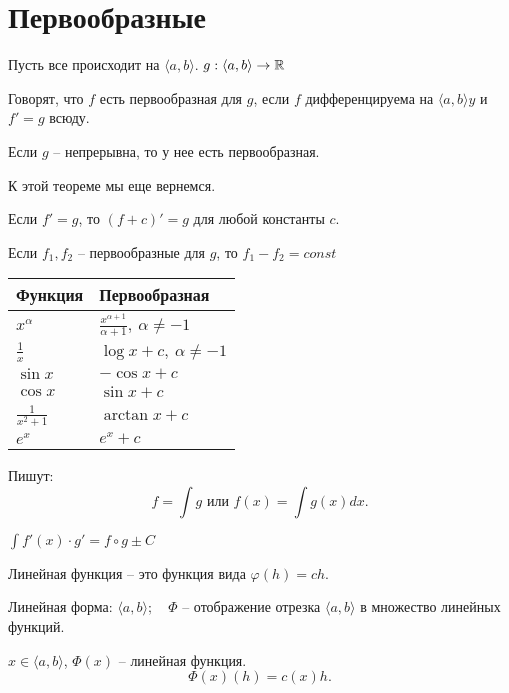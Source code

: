 \documentclass[11pt]{book}
\begin{document}
\section{Первообразные}
Пусть все происходит на $ \langle a, b \rangle$. $ g : \langle a, b \rangle \to  \mathbb{R}$
\begin{defn}
    Говорят, что $ f$ есть первообразная для $ g$, если $ f$ дифференцируема на $ \langle a, b \rangle y$ и $ f' = g$ всюду.
\end{defn}
\begin{thm}
    Если $ g$ -- непрерывна, то у нее есть первообразная.
\end{thm}
\begin{note}
    К этой теореме мы еще вернемся.
\end{note}
\begin{st}
    Если $ f' = g$, то $ (f + c)' = g$ для любой константы  $ c$.
\end{st}
\begin{thm}
    Если $ f_1, f_2$ -- первообразные для $ g$, то $ f_1 - f_2 = const$
\end{thm}
\renewcommand{\arraystretch}{1.5}
\begin{tabular}[ht]{|l|l|}
    \hline
    Функция & Первообразная \\
    \hline
    $ x^{ \alpha }$ & $ \frac{x^{ \alpha + 1}}{\alpha + 1}, ~ \alpha \ne -1$\\
    \hline
    $ \frac{1}{x}$ & $ \log x + c, ~ \alpha \ne -1$ \\
    \hline
    $ \sin x$ & $ -\cos x + c$\\
    \hline
    $ \cos x$ & $ \sin x + c$\\
    \hline
    $ \frac{1}{x^2+1}$ & $ \arctan x + c$\\
    \hline
    $ e^{x}$ & $ e^{x} + c$ \\
    \hline
\end{tabular}
\begin{name}
    Пишут: \[
	f = \int g \text{ или } f(x) = \int g(x) dx
    .\]
\end{name}
\begin{st}
    $ \int f'(x) \cdot g' = f \circ g \pm C$
\end{st}
\begin{defn}
    Линейная функция -- это функция вида $ \varphi  (h) = ch$.

    Линейная форма:
    $\langle a, b \rangle; \quad \Phi $ -- отображение отрезка $ \langle a, b \rangle$ в множество линейных функций.

    $ x \in  \langle a, b \rangle$, $ \Phi(x) $ -- линейная функция.
    \[
	\Phi(x)(h) = c (x) h
    .\]
\end{defn}
\end{document}

